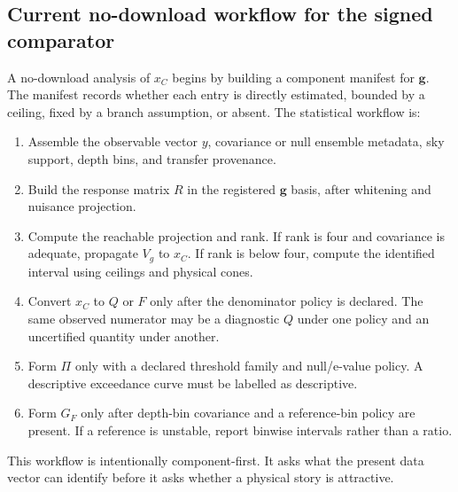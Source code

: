 \documentclass[11pt]{article}
\begin{document}
\subsection{Current no-download workflow for the signed comparator}
A no-download analysis of \(x_C\) begins by building a component manifest for \(\bm g\).  The manifest records whether each entry is directly estimated, bounded by a ceiling, fixed by a branch assumption, or absent.  The statistical workflow is:
\begin{enumerate}
  \item Assemble the observable vector \(y\), covariance or null ensemble metadata, sky support, depth bins, and transfer provenance.
  \item Build the response matrix \(R\) in the registered \(\bm g\) basis, after whitening and nuisance projection.
  \item Compute the reachable projection and rank.  If rank is four and covariance is adequate, propagate \(V_g\) to \(x_C\).  If rank is below four, compute the identified interval using ceilings and physical cones.
  \item Convert \(x_C\) to \(Q\) or \(F\) only after the denominator policy is declared.  The same observed numerator may be a diagnostic \(Q\) under one policy and an uncertified quantity under another.
  \item Form \(\Pi\) only with a declared threshold family and null/e-value policy.  A descriptive exceedance curve must be labelled as descriptive.
  \item Form \(G_F\) only after depth-bin covariance and a reference-bin policy are present.  If a reference is unstable, report binwise intervals rather than a ratio.
\end{enumerate}
This workflow is intentionally component-first.  It asks what the present data vector can identify before it asks whether a physical story is attractive.
\end{document}
